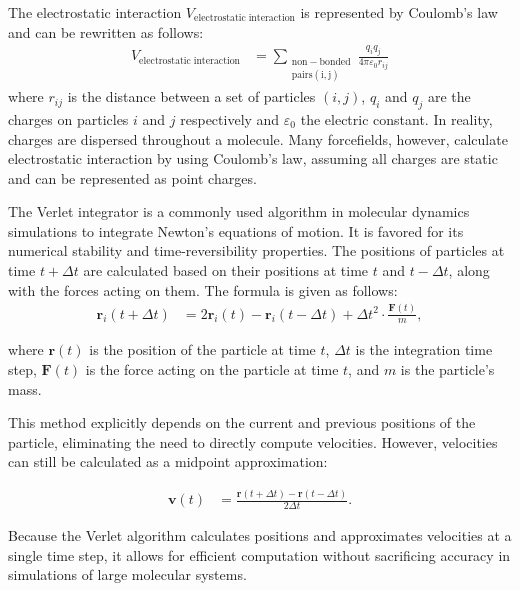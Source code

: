 \documentclass[conference]{IEEEtran}
\begin{document}
The electrostatic interaction $V_{\mathrm{electrostatic \; interaction}}$ is represented by Coulomb's law and can 
be rewritten as follows: 
\begin{equation}
    \begin{aligned}
    V_{\mathrm{electrostatic \; interaction}} &= \sum_{\mathrm{\substack{\mathrm{non-bonded} \\ \mathrm{pairs(i,j)}}}} \frac{q_i q_j}{4\pi\varepsilon_0r_{ij}}
    \end{aligned}
\end{equation}
where $r_{ij}$ is the distance between a set of particles $(i,j)$, $q_i$ and $q_j$ are the charges on particles $i$ 
and $j$ respectively and $\varepsilon_0$ the electric constant. In reality, charges are dispersed throughout a 
molecule. Many forcefields, however, calculate electrostatic interaction by using Coulomb's law, assuming all charges 
are static and can be represented as point charges. 

The Verlet integrator is a commonly used algorithm in molecular dynamics simulations to integrate Newton's equations 
of motion. It is favored for its numerical stability and time-reversibility properties. The positions of particles 
at time \( t + \Delta t \) are calculated based on their positions at time \( t \) and \( t - \Delta t \), along 
with the forces acting on them. The formula is given as follows:
\begin{align}
    \mathbf{r}_i(t + \Delta t) &= 2\mathbf{r}_i(t) - \mathbf{r}_i(t - \Delta t) + \Delta t^2 \cdot \frac{\mathbf{F}(t)}{m},
\end{align}

where \( \mathbf{r}(t) \) is the position of the particle at time \( t \), \( \Delta t \) is the integration time 
step, \( \mathbf{F}(t) \) is the force acting on the particle at time \( t \), and \( m \) is the particle's mass.

This method explicitly depends on the current and previous positions of the particle, eliminating the need to directly 
compute velocities. However, velocities can still be calculated as a midpoint approximation:

\begin{equation}
    \begin{aligned}
    \mathbf{v}(t) &= \frac{\mathbf{r}(t + \Delta t) - \mathbf{r}(t - \Delta t)}{2\Delta t}.
    \end{aligned}
\end{equation}

Because the Verlet algorithm calculates positions and approximates velocities at a single time step, it allows for 
efficient computation without sacrificing accuracy in simulations of large molecular systems.
\end{document}
